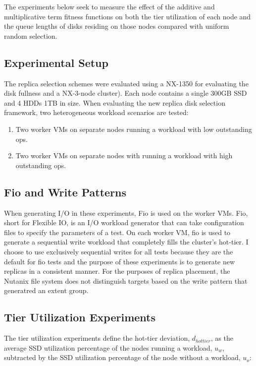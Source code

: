 \documentclass[12pt]{article}
\begin{document}
The experiments below seek to measure the effect of the additive and
multiplicative term fitness functions on both the tier utilization of each node
and the queue lengths of disks residing on those nodes compared with uniform
random selection.

  \subsection{Experimental Setup}

  The replica selection schemes were evaluated using a NX-1350 for evaluating
  the disk fullness and a NX-3-node cluster). Each node contains a single 300GB
  SSD and 4 HDDs 1TB in size. When evaluating the new replica disk selection
  framework, two heterogeneous workload scenarios are tested:
 
  \begin{enumerate}
    \item Two worker VMs on separate nodes running a workload with low
          outstanding ops.
    \item Two worker VMs on separate nodes with running a
          workload with high outstanding ops.
  \end{enumerate}
 
  \subsection{Fio and Write Patterns}

  When generating I/O in these experiments, Fio is used on the worker VMs. Fio,
  short for Flexible IO, is an I/O workload generator that can take
  configuration files to specify the parameters of a test. On each worker VM,
  fio is used to generate a sequential write workload that completely fills the
  cluster's hot-tier. I choose to use exclusively sequential writes for all
  tests because they are the default for fio tests and the purpose of these
  experiments is to generate new replicas in a consistent manner. For the
  purposes of replica placement, the Nutanix file system does not distinguish
  targets based on the write pattern that generatred an extent group.

  \subsection{Tier Utilization Experiments}

  The tier utilization experiments define the hot-tier deviation,
  $d_{hot tier}$, as the average SSD utilization percentage of the nodes
  running a workload, $u_{w}$, subtracted by the SSD utilization percentage of
  the node without a workload, $u_{o}$:
  
\end{document}
